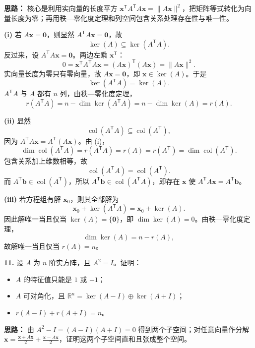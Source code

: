 \ifshowsolutions%
\textbf{思路：} 核心是利用实向量的长度平方 \(\boldsymbol{x}^{\mathsf T}A^{\mathsf T}A\boldsymbol{x}=\|A\boldsymbol{x}\|^2\)，把矩阵等式转化为向量长度为零；再用秩—零化度定理和列空间包含关系处理存在性与唯一性。

\textbf{(i)} 若 \(A\boldsymbol{x}=\boldsymbol{0}\)，则显然 \(A^{\mathsf T}A\boldsymbol{x}=\boldsymbol{0}\)，故
\[
\ker(A)\subseteq\ker(A^{\mathsf T}A).
\]
反过来，设 \(A^{\mathsf T}A\boldsymbol{x}=\boldsymbol{0}\)。两边左乘 \(\boldsymbol{x}^{\mathsf T}\)：
\[
0=\boldsymbol{x}^{\mathsf T}A^{\mathsf T}A\boldsymbol{x}
=(A\boldsymbol{x})^{\mathsf T}(A\boldsymbol{x})
=\|A\boldsymbol{x}\|^2.
\]
实向量长度为零只有零向量，故 \(A\boldsymbol{x}=\boldsymbol{0}\)，即 \(\boldsymbol{x}\in\ker(A)\)。于是
\[
\ker(A^{\mathsf T}A)=\ker(A).
\]
\(A^{\mathsf T}A\) 与 \(A\) 都有 \(n\) 列，由秩—零化度定理，
\[
r(A^{\mathsf T}A)=n-\dim\ker(A^{\mathsf T}A)
=n-\dim\ker(A)=r(A).
\]

\textbf{(ii)} 显然
\[
\operatorname{col}(A^{\mathsf T}A)\subseteq\operatorname{col}(A^{\mathsf T}),
\]
因为 \(A^{\mathsf T}A\boldsymbol{x}=A^{\mathsf T}(A\boldsymbol{x})\)。由 (i)，
\[
\dim\operatorname{col}(A^{\mathsf T}A)=r(A^{\mathsf T}A)=r(A)=r(A^{\mathsf T})
=\dim\operatorname{col}(A^{\mathsf T}).
\]
包含关系加上维数相等，故
\[
\operatorname{col}(A^{\mathsf T}A)=\operatorname{col}(A^{\mathsf T}).
\]
而 \(A^{\mathsf T}\boldsymbol{b}\in\operatorname{col}(A^{\mathsf T})\)，所以 \(A^{\mathsf T}\boldsymbol{b}\in\operatorname{col}(A^{\mathsf T}A)\)，即存在 \(\boldsymbol{x}\) 使 \(A^{\mathsf T}A\boldsymbol{x}=A^{\mathsf T}\boldsymbol{b}\)。

\textbf{(iii)} 若方程组有解 \(\boldsymbol{x}_0\)，则其全部解为
\[
\boldsymbol{x}_0+\ker(A^{\mathsf T}A)=\boldsymbol{x}_0+\ker(A).
\]
因此解唯一当且仅当 \(\ker(A)=\{\boldsymbol{0}\}\)，即 \(\dim\ker(A)=0\)。由秩—零化度定理，
\[
\dim\ker(A)=n-r(A),
\]
故解唯一当且仅当 \(r(A)=n\)。
\else \answerarea[10] \fi%

\textbf{11.} 设 \(A\) 为 \(n\) 阶实方阵，且 \(A^2=I\)。证明：
\begin{itemize}
  \item[(i)] \(A\) 的特征值只能是 \(1\) 或 \(-1\)；
  \item[(ii)] \(A\) 可对角化，且 \(\mathbb R^n=\ker(A-I)\oplus\ker(A+I)\)；
  \item[(iii)] \(r(A-I)+r(A+I)=n\)。
\end{itemize}

\ifshowsolutions%
\textbf{思路：} 由 \(A^2-I=(A-I)(A+I)=0\) 得到两个子空间；对任意向量作分解 \(\boldsymbol{x}=\frac{\boldsymbol{x}+A\boldsymbol{x}}2+\frac{\boldsymbol{x}-A\boldsymbol{x}}2\)，证明这两个子空间直和且张成整个空间。

